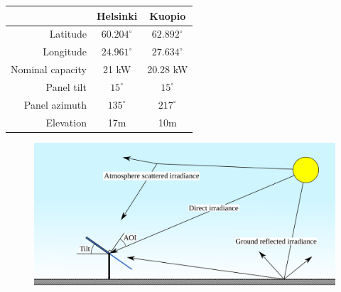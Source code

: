 


\begin{table}[H]
\centering
\begin{tabular}{r|cc} \hline\hline

 & Helsinki & Kuopio\\ \hline
 Latitude & $60.204^\circ$ & $62.892^\circ$ \\
 Longitude & $24.961^\circ$  &  $27.634^\circ$\\
 Nominal capacity &21 kW & 20.28 kW \\
 Panel tilt & $15^\circ$ & $15^\circ$ \\
 Panel azimuth & $135^\circ$ & $217^\circ$ \\
 Elevation & 17m & 10m\\
\hline\hline
\end{tabular}
\label{table_fmi_helsinki_kuopio_parameters}
\end{table}


\begin{figure}[h]
\centering
\includegraphics[width=0.8\linewidth]{pics/irradiancetypes}
\label{fig_simplediagram}
\end{figure}

